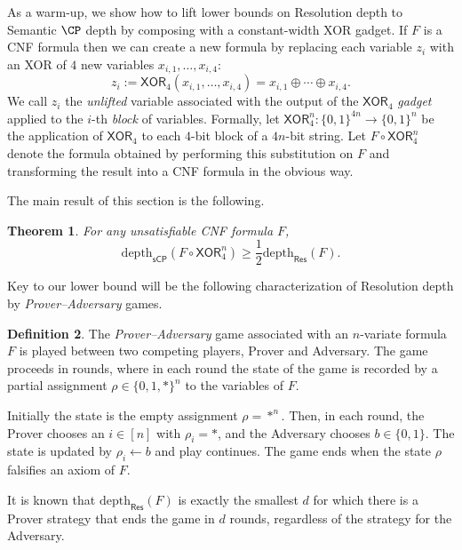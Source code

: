 \documentclass[11pt]{article}
\numberwithin{equation}{section}
\newtheorem{theorem}{Theorem}[section]
\theoremstyle{definition}
\newtheorem{definition}[theorem]{Definition}
\theoremstyle{plain}
\newcounter{cor}\renewcommand{\thecor}{1.1.\arabic{cor}}\newenvironment{cor}{\ifnum\value{cor}=0\refstepcounter{cor}\else\PackageError{toc-native-compat}{Unsupported additional cor envelope}{Only the one exact source-observed cor paragraph is allowed.}\fi}{}\providecommand{\corautorefname}{Theorem}
\newcommand{\boolcube}{\ensuremath{\{0,1\}}}
\newcommand{\depth}{\ensuremath{\mathrm{depth}}}
\newcommand{\Res}{\ensuremath{\mathsf{Res}}}
\newcommand{\XOR}{\ensuremath{\mathsf{XOR}}}
\newcommand{\sCP}{\ensuremath{\mathsf{sCP}}}
\begin{document}
As a warm-up, we show how to lift lower bounds on Resolution depth to Semantic $\CP$ depth by composing with a constant-width XOR gadget.
If $F$ is a CNF formula then we can create a new formula by replacing each variable $z_i$ with an XOR of $4$ new variables $x_{i,1},\ldots, x_{i,4}$:
\[z_i := \XOR_4(x_{i,1},\ldots, x_{i,4}) = x_{i,1} \oplus \cdots \oplus x_{i,4}. \] 
We call $z_i$ the \emph{unlifted} variable associated with the output of the $\XOR_4$ \emph{gadget} applied to the $i$-th \emph{block} of variables. 
Formally, let $\XOR_4^n:\{0,1\}^{4n} \rightarrow \{0,1\}^n$ be the application of $\XOR_4$ to each $4$-bit block of a $4n$-bit string. 
Let $F \circ \XOR_4^n$ denote the formula obtained by performing this substitution on $F$ and transforming the result into a CNF formula in the obvious way.

The main result of this section is the following.
\begin{theorem}\label{thm:cp-depth-lifting}
	For any unsatisfiable CNF formula $F$, \[\depth_{\sCP}(F\circ \XOR_4^n) \geq \frac{1}{2} \depth_{\Res}(F).\]
\end{theorem}

Key to our lower bound will be the following characterization of Resolution depth by \emph{Prover--Adversary} games.

\begin{definition}\label{def:prover-adversary}
	The \emph{Prover--Adversary} game associated with an $n$-variate formula $F$ is played between two competing players, Prover and Adversary. 
	The game proceeds in rounds, where in each round the state of the game is recorded by a partial assignment $\rho\in\{0,1,*\}^n$ to the variables of $F$. 

	Initially the state is the empty assignment $\rho=*^n$. 
	Then, in each round, the Prover chooses an $i \in [n]$ with $\rho_i = *$, and the Adversary chooses $b \in \boolcube$.
	The state is updated by $\rho_i \leftarrow b$ and play continues.
	The game ends when the state $\rho$ falsifies an axiom of $F$. 

	It is known \cite{Pudlak00} that $\depth_{\Res}(F)$ is exactly the smallest $d$ for which there is a Prover strategy that ends the game in $d$ rounds, regardless of the strategy for the Adversary.
\end{definition}
\end{document}
